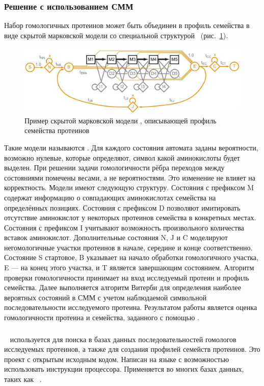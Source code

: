\subsubsection{Решение с использованием СММ}
\label{HMM_solution}
Набор гомологичных протеинов может быть объединен в профиль семейства в виде 
скрытой марковской модели со специальной структурой~\cite{HMM_Eddy}
(рис.~\ref{HMM_example}).
\begin{figure}
  \centering
  \includegraphics[width=\columnwidth]{HMM.png}
  \caption{Пример скрытой марковской модели , описывающей 
	профиль семейства протеинов~\cite{MSV_Eddy}}
  \label{HMM_example}
\end{figure}
Такие модели называются .
Для каждого состояния автомата заданы вероятности, возможно нулевые, которые 
определяют, символ какой аминокислоты будет выделен.
При решении задачи гомологичности рёбра переходов между состояниями помечены
весами, а не вероятностями.
Это изменение не влияет на корректность.
Модели  имеют следующую структуру.
Состояния с префиксом M содержат информацию о совпадающих аминокислотах 
семейства на определённых позициях.
Состояния с префиксом D позволяют имитировать отсутствие аминокислот у 
некоторых протеинов семейства в конкретных местах.
Состояния с префиксом I учитывают возможность произвольного количества 
вставок аминокислот.
Дополнительные состояния N, J и C моделируют негомологичные участки протеинов в 
начале, середине и конце соответственно.
Состояние S стартовое, B указывает на начало обработки гомологичного участка, E 
--- на конец этого участка, и T является завершающим состоянием.
Алгоритм проверки гомологичности принимает на вход исследуемый протеин и 
профиль семейства.
Далее выполняется алгоритм Витерби для определения наиболее вероятных состояний
в СММ с учетом наблюдаемой символьной последовательности исследуемого протеина.
Результатом работы является оценка гомологичности протеина и семейства, 
заданного с помощью .

\subsubsection{}
~\cite{HMMer} используется для поиска в базах данных 
последовательностей гомологов исследуемых протеинов, а также для создания 
профилей семейств протеинов.
Это проект с открытым исходным кодом.
Написан на языке  с возможностью использовать  инструкции 
процессора.
Применяется во многих базах данных, таких как ~\cite{Pfam}.

